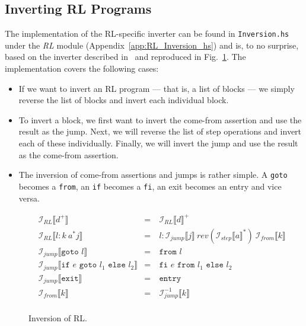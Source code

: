 \subsection{Inverting RL Programs}

The implementation of the RL-specific inverter can be found in \texttt{Inversion.hs} under the \textit{RL} module (Appendix~\ref{app:RL_Inversion_hs}) and is, to no surprise, based on the inverter described in~\cite[Fig.~19]{REV} and reproduced in Fig.~\ref{fig:inversion_rl}. The implementation covers the following cases:
\begin{itemize}
  \item If we want to invert an RL program --- that is, a list of blocks --- we simply reverse the list of blocks and invert each individual block.

  \item To invert a block, we first want to invert the come-from assertion and use the result as the jump. Next, we will reverse the list of step operations and invert each of these individually. Finally, we will invert the jump and use the result as the come-from assertion.

  \item The inversion of come-from assertions and jumps is rather simple. A \texttt{goto} becomes a \texttt{from}, an \texttt{if} becomes a \texttt{fi}, an exit becomes an entry and vice versa.
\end{itemize}

\begin{figure}
  $$\begin{aligned}
    & \mathcal{I}_{RL}\llbracket d^+\rrbracket & =\ & \mathcal{I}_{RL}\llbracket d\rrbracket^+\\
    & \mathcal{I}_{RL}\llbracket l : k\ a^* j\rrbracket & =\ & l: \mathcal{I}_{jump}\llbracket j\rrbracket\ rev(\mathcal{I}_{step}\llbracket a\rrbracket^*)\ \mathcal{I}_{from}\llbracket k\rrbracket\\
    & \mathcal{I}_{jump}\llbracket\texttt{goto }l\rrbracket & =\ & \texttt{from }l\\
    & \mathcal{I}_{jump}\llbracket\texttt{if }e\texttt{ goto }l_1\texttt{ else }l_2\rrbracket & =\ & \texttt{fi }e\texttt{ from }l_1\texttt{ else }l_2\\
    & \mathcal{I}_{jump}\llbracket\texttt{exit}\rrbracket & =\ & \texttt{entry}\\
    & \mathcal{I}_{from}\llbracket k\rrbracket & =\ & \mathcal{I}_{jump}^{-1}\llbracket k\rrbracket\\
  \end{aligned}$$
  \caption{Inversion of RL.}
  \label{fig:inversion_rl}
\end{figure}

